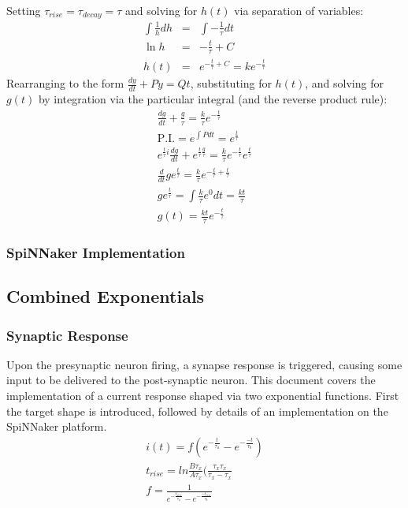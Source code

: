 \documentclass[12pt]{article}
\begin{document}
Setting $\tau_{rise}=\tau_{decay} = \tau$ and solving for $h(t)$ via separation of variables:
\begin{eqnarray}
\int \frac{1}{h} dh & = & \int -\frac{1}{\tau}dt \nonumber \\
\ln{h} & = & -\frac{t}{\tau} + C \nonumber \\
h(t) & = & e^{-\frac{t}{\tau}+C} = ke^{-\frac{t}{\tau}} \nonumber
\label{eqn:solve_for_h}
\end{eqnarray}
Rearranging to the form $\frac{dy}{dt} +Py = Qt$, substituting for $h(t)$, and solving for $g(t)$ by integration via the particular integral (and the reverse product rule):
\begin{eqnarray}
\frac{dg}{dt} + \frac{g}{\tau} =\frac{k}{\tau}e^{-\frac{t}{\tau}} \nonumber \\
\mathrm{P.I.} =  e^{\int P dt} = e^{\frac{t}{\tau}} \nonumber \\
e^{\frac{t}{\tau}i}\frac{dg}{dt} +  e^{\frac{t}{\tau}\frac{g}{\tau}} = \frac{k}{\tau}e^{-\frac{t}{\tau}}e^{\frac{t}{\tau}} \nonumber \\
\frac{d}{dt} g e^{\frac{t}{\tau}} = \frac{k}{\tau}e^{-\frac{t}{\tau} + \frac{t}{\tau}} \nonumber \\
g e^{\frac{t}{\tau}} = \int \frac{k}{\tau}e^0 dt = \frac{kt}{\tau} \nonumber \\
g(t) = \frac{kt}{\tau}e^{-\frac{t}{\tau}}
\end{eqnarray}
\subsubsection*{SpiNNaker Implementation}


\subsection{Combined Exponentials}
\subsubsection*{Synaptic Response}
Upon the presynaptic neuron firing, a synapse response is triggered, causing some input to be delivered to the post-synaptic neuron. This document covers the implementation of a current response shaped via two exponential functions. First the target shape is introduced, followed by details of an implementation on the SpiNNaker platform.
\begin{eqnarray}
i(t) = f(e^{-\frac{t}{\tau_a}} - e^{-\frac{-t}{\tau_b}}) \\
t_{rise} = ln\frac{B\tau_x}{A\tau_x}(\frac{\tau_x\tau_x}{\tau_x - \tau_x} \\
f = \frac{1}{e^{-\frac{t_{rise}}{\tau_a}} - e^{-\frac{-t_{rise}}{\tau_b}}}
\label{eqn:combined_exponential_response}
\end{eqnarray}
\end{document}

